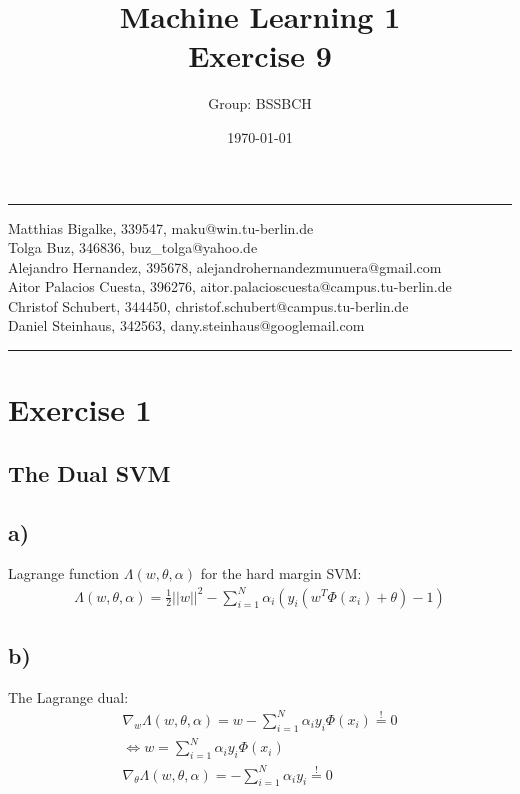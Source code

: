 \documentclass{article}
\title{Machine Learning 1 \\ Exercise 9} %
\author{Group: BSSBCH} %
\date{\today} %
\begin{document}
\maketitle %
\noindent\rule[0.5ex]{\linewidth}{1pt}
Matthias Bigalke, 339547, maku@win.tu-berlin.de \\
Tolga Buz, 346836, buz\_tolga@yahoo.de \\
Alejandro Hernandez, 395678, alejandrohernandezmunuera@gmail.com \\
Aitor Palacios Cuesta, 396276, aitor.palacioscuesta@campus.tu-berlin.de \\
Christof Schubert, 344450, christof.schubert@campus.tu-berlin.de \\
Daniel Steinhaus, 342563, dany.steinhaus@googlemail.com\\
\noindent\rule[0.5ex]{\linewidth}{1pt}


\section*{Exercise 1}

\subsection*{The Dual SVM}

\subsection*{a)}

Lagrange function $\Lambda(w, \theta, \alpha)$ for the hard margin SVM: \\
\begin{align}
    \Lambda(w,\theta ,\alpha) = \frac{1}{2} ||w||^2 - \sum_{i=1}^N \alpha_i(y_i(w^T \Phi(x_i) + \theta)-1)
\end{align}

\subsection*{b)}
The Lagrange dual:
\begin{align}
    \nabla_w\Lambda(w,\theta,\alpha)=w-\sum_{i=1}^N \alpha_i y_i \Phi(x_i) \stackrel{!}{=} 0\\
    \Longleftrightarrow w = \sum_{i=1}^N \alpha_i y_i \Phi(x_i) ~~~~~~ \\
    \nabla_\theta \Lambda(w,\theta,\alpha) = - \sum_{i=1}^N \alpha_i y_i \stackrel{!}{=} 0
\end{align}
\end{document}
